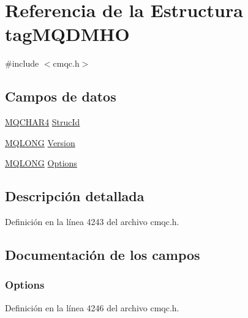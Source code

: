 \hypertarget{structtag_m_q_d_m_h_o}{}\section{Referencia de la Estructura tag\+M\+Q\+D\+M\+H\+O}
\label{structtag_m_q_d_m_h_o}


{\ttfamily \#include $<$cmqc.\+h$>$}

\subsection*{Campos de datos}
\begin{DoxyCompactItemize}
\item 
\hyperlink{cmqc_8h_a12590e546ed66fda7cf21c1d5cefa31d}{M\+Q\+C\+H\+A\+R4} \hyperlink{structtag_m_q_d_m_h_o_a0530922ca944569b52601d74941f96e4}{Struc\+Id}
\item 
\hyperlink{cmqc_8h_a1fb8d28cbda3fa8766a9821230cdb6d5}{M\+Q\+L\+O\+N\+G} \hyperlink{structtag_m_q_d_m_h_o_a0656ef8f766b3907d394d88a35d7b7e9}{Version}
\item 
\hyperlink{cmqc_8h_a1fb8d28cbda3fa8766a9821230cdb6d5}{M\+Q\+L\+O\+N\+G} \hyperlink{structtag_m_q_d_m_h_o_ad7aff2d6c6044809464380998d24ec5c}{Options}
\end{DoxyCompactItemize}


\subsection{Descripción detallada}


Definición en la línea 4243 del archivo cmqc.\+h.



\subsection{Documentación de los campos}
\hypertarget{structtag_m_q_d_m_h_o_ad7aff2d6c6044809464380998d24ec5c}{}
\subsubsection[{Options}]{ Options}\label{structtag_m_q_d_m_h_o_ad7aff2d6c6044809464380998d24ec5c}


Definición en la línea 4246 del archivo cmqc.\+h.

